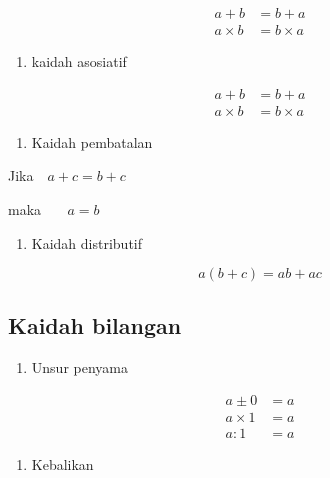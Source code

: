 \documentclass[
  letterpaper,
  DIV=11,
  numbers=noendperiod]{scrartcl}
\providecommand{\tightlist}{%
  \setlength{\itemsep}{0pt}\setlength{\parskip}{0pt}}\usepackage{longtable,booktabs,array}
\begin{document}
\[
\begin{align}
a+b&=b+a \\
a \times b &= b \times a
\end{align}
\]

\begin{enumerate}
\def\labelenumi{\arabic{enumi}.}
\setcounter{enumi}{1}
\tightlist
\item
  kaidah asosiatif
\end{enumerate}

\[
\begin{align}
a+b&=b+a \\
a \times b &= b \times a 
\end{align}
\]

\begin{enumerate}
\def\labelenumi{\arabic{enumi}.}
\setcounter{enumi}{2}
\tightlist
\item
  Kaidah pembatalan
\end{enumerate}

Jika \(\ \ \ a+c = b+c\)

maka \(\ \ \ \ \ \ \ a = b\)

\begin{enumerate}
\def\labelenumi{\arabic{enumi}.}
\setcounter{enumi}{3}
\tightlist
\item
  Kaidah distributif
\end{enumerate}

\[
a(b+c)=ab+ac
\]

\subsection{Kaidah bilangan}\label{kaidah-bilangan-1}

\begin{enumerate}
\def\labelenumi{\arabic{enumi}.}
\setcounter{enumi}{4}
\tightlist
\item
  Unsur penyama
\end{enumerate}

\[
\begin{align}
a \pm 0 &= a \\
a \times 1 &= a \\
a : 1 &= a
\end{align}
\]

\begin{enumerate}
\def\labelenumi{\arabic{enumi}.}
\setcounter{enumi}{5}
\tightlist
\item
  Kebalikan
\end{enumerate}
\end{document}
